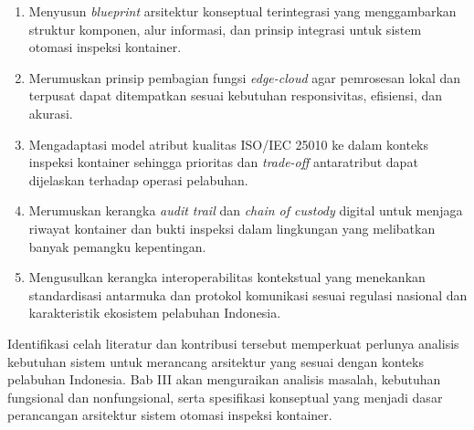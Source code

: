 \begin{enumerate}
  \item Menyusun \textit{blueprint} arsitektur konseptual terintegrasi yang
  menggambarkan struktur komponen, alur informasi, dan prinsip integrasi untuk
  sistem otomasi inspeksi kontainer.
  \item Merumuskan prinsip pembagian fungsi \textit{edge-cloud} agar pemrosesan
  lokal dan terpusat dapat ditempatkan sesuai kebutuhan responsivitas, efisiensi,
  dan akurasi.
  \item Mengadaptasi model atribut kualitas ISO/IEC 25010 ke dalam konteks
  inspeksi kontainer sehingga prioritas dan \textit{trade-off} antaratribut dapat
  dijelaskan terhadap operasi pelabuhan.
  \item Merumuskan kerangka \textit{audit trail} dan \textit{chain of custody}
  digital untuk menjaga riwayat kontainer dan bukti inspeksi dalam lingkungan yang
  melibatkan banyak pemangku kepentingan.
  \item Mengusulkan kerangka interoperabilitas kontekstual yang menekankan
  standardisasi antarmuka dan protokol komunikasi sesuai regulasi nasional dan
  karakteristik ekosistem pelabuhan Indonesia.
\end{enumerate}

Identifikasi celah literatur dan kontribusi tersebut memperkuat perlunya
analisis kebutuhan sistem untuk merancang arsitektur yang sesuai dengan konteks
pelabuhan Indonesia. Bab III akan menguraikan analisis masalah, kebutuhan
fungsional dan nonfungsional, serta spesifikasi konseptual yang menjadi dasar
perancangan arsitektur sistem otomasi inspeksi kontainer.
